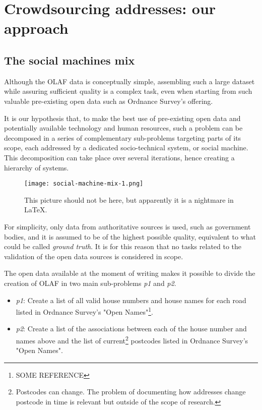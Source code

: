 \section{Crowdsourcing addresses: our approach}

\subsection{The social machines mix}

    Although the OLAF data is conceptually simple, assembling such a large dataset while assuring sufficient quality is a complex task, even when starting from such valuable pre-existing open data such as Ordnance Survey's offering.
    
    It is our hypothesis that, to make the best use of pre-existing open data and potentially available technology and human resources, such a problem can be decomposed in a series of complementary sub-problems targeting parts of its scope, each addressed by a dedicated socio-technical system, or social machine. This decomposition can take place over several iterations, hence creating a hierarchy of systems. 

    \begin{figure*}
    	\texttt{[image: social-machine-mix-1.png]}
    	\caption{This picture should not be here, but apparently it is a nightmare in LaTeX.}
    	\label{fig:social_machine_mix_1}
    \end{figure*}

    For simplicity, only data from authoritative sources is used, such as government bodies, and it is assumed to be of the highest possible quality, equivalent to what could be called {\it ground truth}. It is for this reason that no tasks related to the validation of the open data sources is considered in scope.
    
    The open data available at the moment of writing makes it possible to divide the creation of OLAF in two main sub-problems {\it p1} and {\it p2}. 
    
    \begin{itemize}
        \item {\it p1}: Create a list of all valid house numbers and house names for each road listed in Ordnance Survey's "Open Names"\footnote{SOME REFERENCE}.
        \item {\it p2}: Create a list of the associations between each of the house number and names above and the list of current\footnote{Postcodes can change. The problem of documenting how addresses change postcode in time is relevant but outside of the scope of research.} postcodes listed in Ordnance Survey's "Open Names". 
    \end{itemize}

